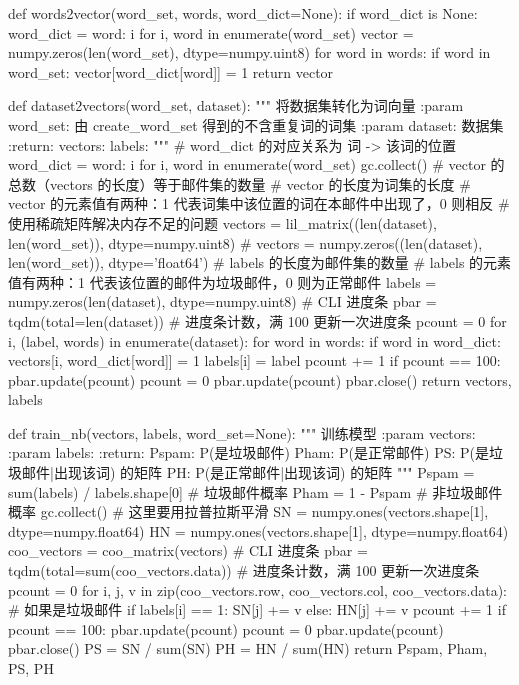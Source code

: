 \documentclass[UTF8,zihao=-4]{ctexart}
\begin{document}
\begin{python}
def words2vector(word_set, words, word_dict=None):
    if word_dict is None:
        word_dict = {word: i for i, word in enumerate(word_set)}
    vector = numpy.zeros(len(word_set), dtype=numpy.uint8)
    for word in words:
        if word in word_set:
            vector[word_dict[word]] = 1
    return vector


def dataset2vectors(word_set, dataset):
    """
    将数据集转化为词向量
    :param word_set: 由 create_word_set 得到的不含重复词的词集
    :param dataset:  数据集
    :return:
        vectors:
        labels:
    """
    # word_dict 的对应关系为 词 -> 该词的位置
    word_dict = {word: i for i, word in enumerate(word_set)}
    gc.collect()
    # vector 的总数（vectors 的长度）等于邮件集的数量
    # vector 的长度为词集的长度
    # vector 的元素值有两种：1 代表词集中该位置的词在本邮件中出现了，0 则相反
    # 使用稀疏矩阵解决内存不足的问题
    vectors = lil_matrix((len(dataset), len(word_set)), dtype=numpy.uint8)
    # vectors = numpy.zeros((len(dataset), len(word_set)), dtype='float64')
    # labels 的长度为邮件集的数量
    # labels 的元素值有两种：1 代表该位置的邮件为垃圾邮件，0 则为正常邮件
    labels = numpy.zeros(len(dataset), dtype=numpy.uint8)
    # CLI 进度条
    pbar = tqdm(total=len(dataset))
    # 进度条计数，满 100 更新一次进度条
    pcount = 0
    for i, (label, words) in enumerate(dataset):
        for word in words:
            if word in word_dict:
                vectors[i, word_dict[word]] = 1
        labels[i] = label
        pcount += 1
        if pcount == 100:
            pbar.update(pcount)
            pcount = 0
    pbar.update(pcount)
    pbar.close()
    return vectors, labels


def train_nb(vectors, labels, word_set=None):
    """
    训练模型
    :param vectors:
    :param labels:
    :return:
        Pspam: P(是垃圾邮件)
        Pham:  P(是正常邮件)
        PS: P(是垃圾邮件|出现该词) 的矩阵
        PH: P(是正常邮件|出现该词) 的矩阵
    """
    Pspam = sum(labels) / labels.shape[0]  # 垃圾邮件概率
    Pham = 1 - Pspam  # 非垃圾邮件概率
    gc.collect()
    # 这里要用拉普拉斯平滑
    SN = numpy.ones(vectors.shape[1], dtype=numpy.float64)
    HN = numpy.ones(vectors.shape[1], dtype=numpy.float64)
    coo_vectors = coo_matrix(vectors)
    # CLI 进度条
    pbar = tqdm(total=sum(coo_vectors.data))
    # 进度条计数，满 100 更新一次进度条
    pcount = 0
    for i, j, v in zip(coo_vectors.row, coo_vectors.col, coo_vectors.data):
        # 如果是垃圾邮件
        if labels[i] == 1:
            SN[j] += v
        else:
            HN[j] += v
        pcount += 1
        if pcount == 100:
            pbar.update(pcount)
            pcount = 0
    pbar.update(pcount)
    pbar.close()
    PS = SN / sum(SN)
    PH = HN / sum(HN)
    return Pspam, Pham, PS, PH



\end{python}
\end{document}
